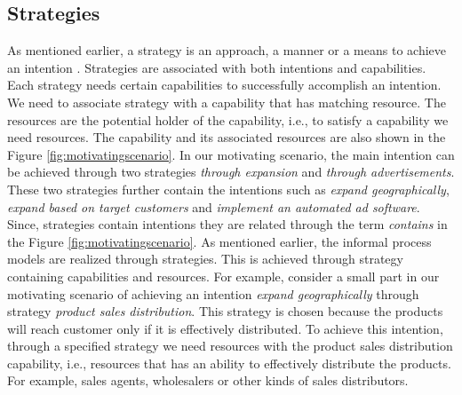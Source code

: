 \subsection{Strategies} 
\label{sec:strategies}
As mentioned earlier, a strategy is an approach, a manner or a means to achieve an intention \cite{Bider2005}. Strategies are associated with both intentions and capabilities. Each strategy needs certain capabilities to successfully accomplish an intention. We need to associate strategy with a capability that has matching resource. The resources are the potential holder of the capability, i.e., to satisfy a capability we need resources. The capability and its associated resources are also shown in the Figure \ref{fig:motivatingscenario}. In our motivating scenario, the main intention can be achieved through two strategies \textit{through expansion} and \textit{through advertisements}. These two strategies further contain the intentions such as \textit{expand geographically}, \textit{expand based on target customers} and \textit{implement an automated ad software}. Since, strategies contain intentions they are related through the term \textit{contains} in the Figure \ref{fig:motivatingscenario}. As mentioned earlier, the informal process models are realized through strategies. This is achieved through strategy containing capabilities and resources. For example, consider a small part in our motivating scenario of achieving an intention \textit{expand geographically} through strategy \textit{product sales distribution}. This strategy is chosen because the products will reach customer only if it is effectively distributed. To achieve this intention, through a specified strategy we need resources with the product sales distribution capability, i.e., resources that has an ability to effectively distribute the products. For example, sales agents, wholesalers or other kinds of sales distributors. 

